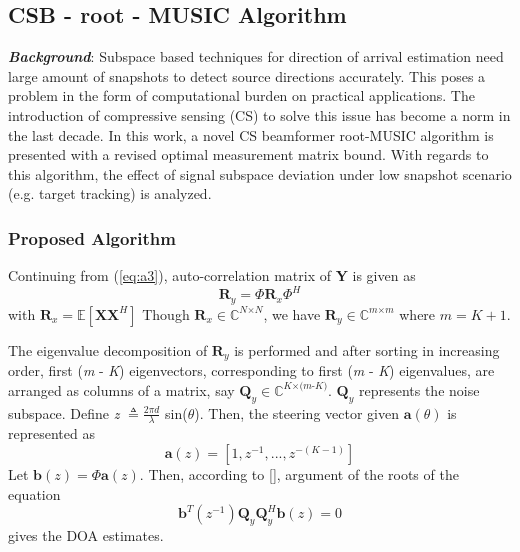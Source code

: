 \documentclass[12pt,a4paper]{article}
\theoremstyle{plain}
\theoremstyle{definition}
\begin{document}
\subsection{CSB - root - MUSIC Algorithm}
\textbf{\emph{Background}}: Subspace based techniques for direction
of arrival estimation need large amount of snapshots to detect source directions accurately. This poses a problem in the form of computational burden on practical applications. The introduction
of compressive sensing (CS) to solve this issue has become a norm in the last decade. In this work, a novel CS beamformer root-MUSIC algorithm is presented with a revised optimal measurement matrix
bound. With regards to this algorithm, the effect of signal subspace deviation under low snapshot scenario (e.g. target tracking) is analyzed.
\subsubsection{Proposed Algorithm}
Continuing from (\ref{eq:a3}), auto-correlation matrix of \textbf{Y} is given as
\begin{equation}\label{eq:a6}
\textbf{R}_{y} = \Phi\textbf{R}_{x}\Phi^{H}
\end{equation}
with $\textbf{R}_{x} = \mathbb{E}[\textbf{XX}^H]$
Though $\textbf{R}_{x} \in \displaystyle\mathbb{C}^{\textit{N$\times$N}}$, we have $\textbf{R}_{y} \in \displaystyle\mathbb{C}^{\textit{m$\times$m}}$ where \(m= K + 1\). 

The eigenvalue decomposition of $\textbf{R}_{y}$ is performed and after sorting in increasing order, first (\textit{m} - \textit{K}) eigenvectors, corresponding to first (\textit{m} - \textit{K}) eigenvalues, are arranged as columns of a matrix, say $\textbf{Q}_y \in \displaystyle\mathbb{C}^{\textit{K$\times$(m-K)}}$. $\textbf{Q}_y$ represents the noise subspace. Define \textit{z} $\triangleq \frac{{2}\pi{d}}{\lambda}$ sin($\theta$). Then, the steering vector given $\textbf{a}(\theta)$ is represented as
\begin{equation}\label{eq:a7}
\textbf{a}(z) = [1, z^{-1}, ..., z^{-(K-1)}] 
\end{equation}
Let \(\textbf{b}(z)=\Phi\textbf{a}(z)\). Then, according to [\citet{R7}], argument of the roots of the equation \begin{equation}
\textbf{b}^T(z^{-1})\textbf{Q}_y\textbf{Q}_y^H\textbf{b}(z)=0
\end{equation} 
gives the DOA estimates.
\end{document}
